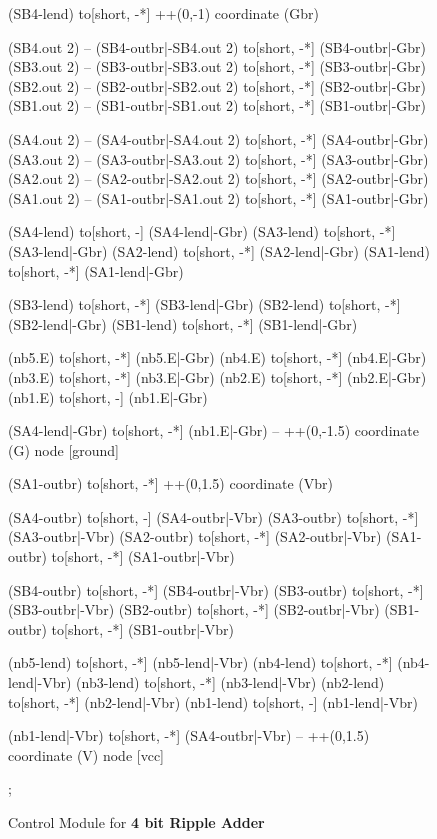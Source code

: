 \documentclass[a4paper, 10pt]{article}
\begin{document}
\begin{figure}[!h]
{\begin{circuitikz}[american, rotate=-90, transform shape]

			(SB4-lend) to[short, -*] ++(0,-1)
			coordinate (Gbr)

			(SB4.out 2) -- (SB4-outbr|-SB4.out 2)
			to[short, -*] (SB4-outbr|-Gbr)
			(SB3.out 2) -- (SB3-outbr|-SB3.out 2)
			to[short, -*] (SB3-outbr|-Gbr)
			(SB2.out 2) -- (SB2-outbr|-SB2.out 2)
			to[short, -*] (SB2-outbr|-Gbr)
			(SB1.out 2) -- (SB1-outbr|-SB1.out 2)
			to[short, -*] (SB1-outbr|-Gbr)

			(SA4.out 2) -- (SA4-outbr|-SA4.out 2)
			to[short, -*] (SA4-outbr|-Gbr)
			(SA3.out 2) -- (SA3-outbr|-SA3.out 2)
			to[short, -*] (SA3-outbr|-Gbr)
			(SA2.out 2) -- (SA2-outbr|-SA2.out 2)
			to[short, -*] (SA2-outbr|-Gbr)
			(SA1.out 2) -- (SA1-outbr|-SA1.out 2)
			to[short, -*] (SA1-outbr|-Gbr)

			(SA4-lend) to[short, -] (SA4-lend|-Gbr)
			(SA3-lend) to[short, -*] (SA3-lend|-Gbr)
			(SA2-lend) to[short, -*] (SA2-lend|-Gbr)
			(SA1-lend) to[short, -*] (SA1-lend|-Gbr)

			(SB3-lend) to[short, -*] (SB3-lend|-Gbr)
			(SB2-lend) to[short, -*] (SB2-lend|-Gbr)
			(SB1-lend) to[short, -*] (SB1-lend|-Gbr)

			(nb5.E) to[short, -*] (nb5.E|-Gbr)
			(nb4.E) to[short, -*] (nb4.E|-Gbr)
			(nb3.E) to[short, -*] (nb3.E|-Gbr)
			(nb2.E) to[short, -*] (nb2.E|-Gbr)
			(nb1.E) to[short, -] (nb1.E|-Gbr)

			(SA4-lend|-Gbr)
			to[short, -*] (nb1.E|-Gbr)
			-- ++(0,-1.5)
			coordinate (G)
			node [ground] {}


			(SA1-outbr) to[short, -*] ++(0,1.5)
			coordinate (Vbr)

			(SA4-outbr) to[short, -] (SA4-outbr|-Vbr)
			(SA3-outbr) to[short, -*] (SA3-outbr|-Vbr)
			(SA2-outbr) to[short, -*] (SA2-outbr|-Vbr)
			(SA1-outbr) to[short, -*] (SA1-outbr|-Vbr)

			(SB4-outbr) to[short, -*] (SB4-outbr|-Vbr)
			(SB3-outbr) to[short, -*] (SB3-outbr|-Vbr)
			(SB2-outbr) to[short, -*] (SB2-outbr|-Vbr)
			(SB1-outbr) to[short, -*] (SB1-outbr|-Vbr)


			(nb5-lend) to[short, -*] (nb5-lend|-Vbr)
			(nb4-lend) to[short, -*] (nb4-lend|-Vbr)
			(nb3-lend) to[short, -*] (nb3-lend|-Vbr)
			(nb2-lend) to[short, -*] (nb2-lend|-Vbr)
			(nb1-lend) to[short, -] (nb1-lend|-Vbr)

			(nb1-lend|-Vbr)
			to[short, -*] (SA4-outbr|-Vbr)
			-- ++(0,1.5)
			coordinate (V)
			node [vcc] {\vccPotential}

			;

		\end{circuitikz}
		}
		\caption{Control Module for \textbf{4 bit Ripple Adder}}
	\end{figure}
\end{document}
